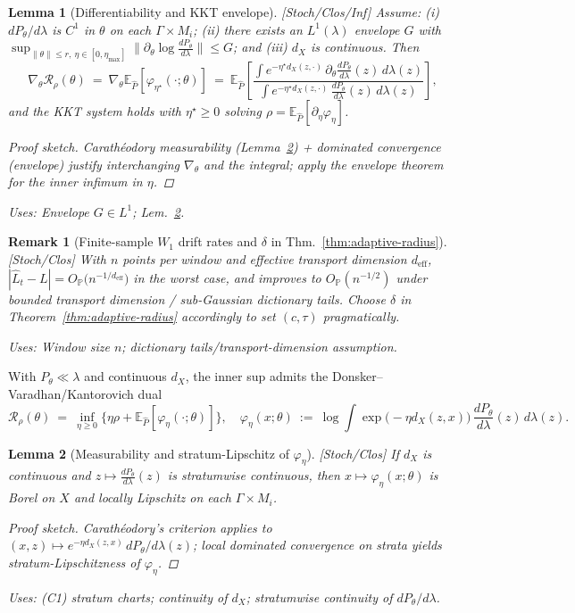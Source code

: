 \documentclass[10pt]{article}
\newcommand{\uses}[1]{\par\smallskip\noindent\textit{Uses: }#1\par\smallskip}
\newenvironment{proofsketch}{\begin{proof}[Proof sketch]}{\end{proof}}
\newtheorem{lemma}{Lemma}
\newtheorem{remark}{Remark}
\begin{document}
\begin{lemma}[Differentiability and KKT envelope]\label{lem:dv-kkt}
\emph{[\textup{Stoch/Clos/Inf}]}
Assume: (i) $dP_\theta/d\lambda$ is $C^1$ in $\theta$ on each $\Gamma\times M_i$; 
(ii) there exists an $L^1(\lambda)$ envelope $G$ with $\sup_{\|\theta\|\le r,\ \eta\in[0,\eta_{\max}]}\big\|\partial_\theta \log\frac{dP_\theta}{d\lambda}\big\|\le G$; and (iii) $d_X$ is continuous. Then
\[
\nabla_\theta \mathcal R_\rho(\theta)\ =\ \nabla_\theta \mathbb E_{\hat P}\!\left[\varphi_{\eta^\star}(\cdot;\theta)\right]
\ =\ \mathbb E_{\hat P}\!\left[\frac{\int e^{-\eta^\star d_X(z,\cdot)}\,\partial_\theta \frac{dP_\theta}{d\lambda}(z)\,d\lambda(z)}{\int e^{-\eta^\star d_X(z,\cdot)}\,\frac{dP_\theta}{d\lambda}(z)\,d\lambda(z)}\right],
\]
and the KKT system holds with $\eta^\star\ge 0$ solving $\rho=\mathbb E_{\hat P}[\partial_\eta \varphi_\eta]$. 
\begin{proofsketch}
Carathéodory measurability (Lemma~\ref{lem:varphi-meas}) + dominated convergence (envelope) justify interchanging $\nabla_\theta$ and the integral; apply the envelope theorem for the inner infimum in $\eta$.
\end{proofsketch}
\uses{Envelope $G\in L^1$; Lem.~\ref{lem:varphi-meas}.}
\end{lemma}

\begin{remark}[Finite-sample $W_1$ drift rates and $\delta$ in Thm.~\ref{thm:adaptive-radius}]\label{rem:w1-rates}
\emph{[\textup{Stoch/Clos}]}
With $n$ points per window and effective transport dimension $d_{\mathrm{eff}}$,
\(
|\hat L_t - L| = O_{\mathbb P}\!\big(n^{-1/d_{\mathrm{eff}}}\big)
\)
in the worst case, and improves to
\(
O_{\mathbb P}(n^{-1/2})
\)
under bounded transport dimension / sub-Gaussian dictionary tails. 
Choose $\delta$ in Theorem~\ref{thm:adaptive-radius} accordingly to set $(c,\tau)$ pragmatically.
\uses{Window size $n$; dictionary tails/transport-dimension assumption.}
\end{remark}


With $P_\theta\ll\lambda$ and continuous $d_X$, the inner sup admits the Donsker–Varadhan/Kantorovich dual
\[
\mathcal R_\rho(\theta)
\ =\ \inf_{\eta\ge 0}\Big\{\eta\rho+\mathbb E_{\hat P}[\varphi_\eta(\cdot;\theta)]\Big\},
\quad
\varphi_\eta(x;\theta)\ :=\ \log \int \exp\!\big(-\eta d_X(z,x)\big)\,\frac{dP_\theta}{d\lambda}(z)\,d\lambda(z).
\]

\begin{lemma}[Measurability and stratum-Lipschitz of $\varphi_\eta$]\label{lem:varphi-meas}
\emph{[\textup{Stoch/Clos}]} If $d_X$ is continuous and $z\mapsto \frac{dP_\theta}{d\lambda}(z)$ is stratumwise continuous, then $x\mapsto \varphi_\eta(x;\theta)$ is Borel on $X$ and locally Lipschitz on each $\Gamma\times M_i$.
\begin{proofsketch}
Carathéodory’s criterion applies to $(x,z)\mapsto e^{-\eta d_X(z,x)}\,dP_\theta/d\lambda(z)$; local dominated convergence on strata yields stratum-Lipschitzness of $\varphi_\eta$.
\end{proofsketch}
\uses{(C1) stratum charts; continuity of $d_X$; stratumwise continuity of $dP_\theta/d\lambda$.}
\end{lemma}
\end{document}
